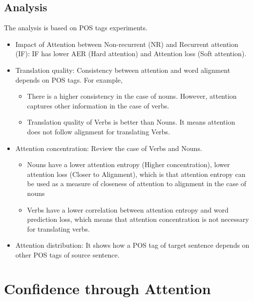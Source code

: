 \documentclass{article}
\begin{document}
\subsection{Analysis}
The analysis is based on POS tags experiments.
\begin{itemize}
\item Impact of Attention between Non-recurrent (NR) and Recurrent attention (IF): IF has lower AER (Hard attention) and Attention loss (Soft attention).
\item Translation quality: Consistency between attention and word alignment depends on POS tags. For example,
	\begin{itemize}
	\item There is a higher consistency in the case of nouns. However, attention captures other information in the case of verbs.
	\item Translation quality of Verbs is better than Nouns. It means attention does not follow alignment for translating Verbs.
	\end{itemize}
\item Attention concentration: Review the case of Verbs and Nouns.
	\begin{itemize}
	\item Nouns have a lower attention entropy (Higher concentration), lower attention loss (Closer to Alignment), which is that attention entropy can be used as a measure of closeness of attention to alignment in the case of nouns
	\item Verbs have a lower correlation between attention entropy and word prediction loss, which means that attention concentration is not necessary for translating verbs.
	\end{itemize}
\item Attention distribution: It shows how a POS tag of target sentence depends on other POS tags of source sentence.
\end{itemize}


\section{Confidence through Attention \citep{Rikters2017confidence}}
\end{document}
